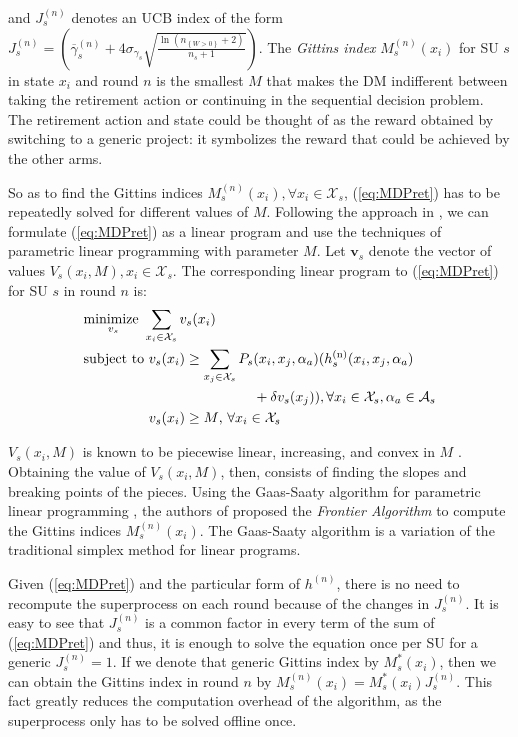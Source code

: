 and $J_s^{(n)}$ denotes an UCB index of the form $J_s^{(n)} = \left(\overline{\gamma}_{s}^{(n)}+4\sigma_{\gamma_s}\sqrt{\frac{\ln{(n_{\left\{W>0\right\}}+2)}}{n_s+1}}\right)$.
The \textit{Gittins index} $M_s^{(n)}(x_i)$ for SU $s$ in state $x_i$ and round $n$ is the smallest $M$ that makes the DM indifferent between taking the retirement action or continuing in the sequential decision problem. 
The retirement action and state could be thought of as the reward obtained by switching to a generic project: it symbolizes the reward that could be achieved by the other arms.

So as to find the Gittins indices $M_s^{(n)}(x_i), \forall x_i \in \mathcal{X}_s$, (\ref{eq:MDPret}) has to be repeatedly solved for different values of $M$. Following the approach in \cite{ref:Brown2013}, we can formulate (\ref{eq:MDPret}) as a linear program \cite{ref:Bertsekas2005} and use the techniques of parametric linear programming with parameter $M$.
Let $\boldsymbol{v}_s$ denote the vector of values $V_s(x_i,M), x_i \in \mathcal{X}_s$. The corresponding linear program to (\ref{eq:MDPret}) for SU $s$ in round $n$ is: 
\begin{equation}
\begin{split}
  &\underset{v_s}{\text{minimize }}\sum_{x_i \in \mathcal{X}_s} v_s(x_i)\\
  &\text{subject to }v_s(x_i) \geq \sum_{x_j \in \mathcal{X}_s}  P_s(x_i,x_j,\alpha_a)(h_s^\text{(n)}(x_i,x_j,\alpha_a)\\
  &\hphantom{\text{subject to }v_s(x_i) \geq \sum_{x_j \in \mathcal{X}_s} P_s}+\delta v_s(x_j)), \forall x_i \in \mathcal{X}_s,\alpha_a \in \mathcal{A}_s\\
  &\hphantom{\text{subject to }}v_s(x_i)\geq M \text{,    }\forall x_i \in \mathcal{X}_s
\end{split}
\end{equation}

$V_s(x_i,M)$ is known to be piecewise linear, increasing, and convex in $M$ \cite{ref:Brown2013}. Obtaining the value of $V_s(x_i,M)$, then, consists of finding the slopes and breaking points of the pieces. Using the Gaas-Saaty algorithm for parametric linear programming \cite{ref:Gass1955}, the authors of \cite{ref:Brown2013} proposed the \textit{Frontier Algorithm} to compute the Gittins indices $M_s^{(n)}(x_i)$. The Gaas-Saaty algorithm is a variation of the traditional simplex method for linear programs.

Given (\ref{eq:MDPret}) and the particular form of $h^{(n)}$, there is no need to recompute the superprocess on each round because of the changes in $J_s^{(n)}$. It is easy to see that $J_s^{(n)}$ is a common factor in every term of the sum of (\ref{eq:MDPret}) and thus, it is enough to solve the equation once per SU for a generic $J_s^{(n)} = 1$. If we denote that generic Gittins index by $M_s^*(x_i)$, then we can obtain the Gittins index in round $n$ by $M_s^{(n)}(x_i) = M_s^*(x_i)J_s^{(n)}$. This fact greatly reduces the computation overhead of the algorithm, as the superprocess only has to be solved offline once.

